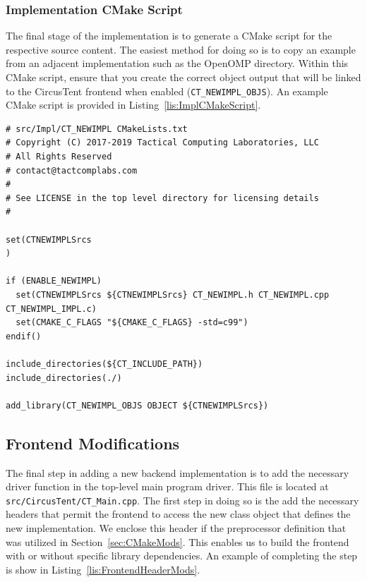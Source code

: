 \documentclass{article}
\begin{document}
\clearpage
\subsubsection{Implementation CMake Script}

The final stage of the implementation is to generate a CMake script 
for the respective source content.  The easiest method for doing so 
is to copy an example from an adjacent implementation such as the OpenOMP 
directory.  Within this CMake script, ensure that you create the correct object output 
that will be linked to the CircusTent frontend when enabled (\texttt{CT\_NEWIMPL\_OBJS}).
An example CMake script is provided in Listing~\ref{lis:ImplCMakeScript}.    

\vspace{0.125in}
\begin{lstlisting}[frame=single,style=base,caption={Implementation CMake Script},captionpos=b,label={lis:ImplCMakeScript}]
# src/Impl/CT_NEWIMPL CMakeLists.txt
# Copyright (C) 2017-2019 Tactical Computing Laboratories, LLC
# All Rights Reserved
# contact@tactcomplabs.com
#
# See LICENSE in the top level directory for licensing details
#

set(CTNEWIMPLSrcs
)

if (ENABLE_NEWIMPL)
  set(CTNEWIMPLSrcs ${CTNEWIMPLSrcs} CT_NEWIMPL.h CT_NEWIMPL.cpp CT_NEWIMPL_IMPL.c)
  set(CMAKE_C_FLAGS "${CMAKE_C_FLAGS} -std=c99")
endif()

include_directories(${CT_INCLUDE_PATH})
include_directories(./)

add_library(CT_NEWIMPL_OBJS OBJECT ${CTNEWIMPLSrcs})
\end{lstlisting}

\clearpage
\subsection{Frontend Modifications}
\label{sec:FrontendMods}

The final step in adding a new backend implementation is to add the necessary 
driver function in the top-level main program driver.  This file is located 
at \texttt{src/CircusTent/CT\_Main.cpp}.  The first step in doing so is the add
the necessary headers that permit the frontend to access the new class object 
that defines the new implementation.  We enclose this header if the preprocessor 
definition that was utilized in Section~\ref{sec:CMakeMods}.  This enables us to build 
the frontend with or without specific library dependencies.  An example of completing 
the step is show in Listing~\ref{lis:FrontendHeaderMods}.  
\end{document}
